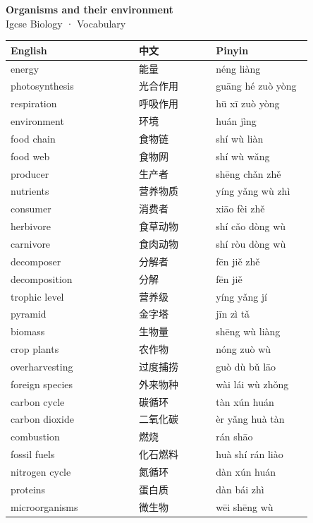 \documentclass[11pt]{article}
\begin{document}
\begin{center}
  {\LARGE\bfseries Organisms and their environment}\\[0.35em]
  {\large Igcse Biology · Vocabulary}
\end{center}
\vspace{0.6em}

\begin{longtable}{@{}p{0.40\linewidth}p{0.24\linewidth}p{0.30\linewidth}@{}}
\toprule
\textbf{English} & \textbf{中文} & \textbf{Pinyin} \\
\midrule
\endhead
\bottomrule
\endlastfoot
energy & 能量 & néng liàng \\
photosynthesis & 光合作用 & guāng hé zuò yòng \\
respiration & 呼吸作用 & hū xī zuò yòng \\
environment & 环境 & huán jìng \\
food chain & 食物链 & shí wù liàn \\
food web & 食物网 & shí wù wǎng \\
producer & 生产者 & shēng chǎn zhě \\
nutrients & 营养物质 & yíng yǎng wù zhì \\
consumer & 消费者 & xiāo fèi zhě \\
herbivore & 食草动物 & shí cǎo dòng wù \\
carnivore & 食肉动物 & shí ròu dòng wù \\
decomposer & 分解者 & fēn jiě zhě \\
decomposition & 分解 & fēn jiě \\
trophic level & 营养级 & yíng yǎng jí \\
pyramid & 金字塔 & jīn zì tǎ \\
biomass & 生物量 & shēng wù liàng \\
crop plants & 农作物 & nóng zuò wù \\
overharvesting & 过度捕捞 & guò dù bǔ lāo \\
foreign species & 外来物种 & wài lái wù zhǒng \\
carbon cycle & 碳循环 & tàn xún huán \\
carbon dioxide & 二氧化碳 & èr yǎng huà tàn \\
combustion & 燃烧 & rán shāo \\
fossil fuels & 化石燃料 & huà shí rán liào \\
nitrogen cycle & 氮循环 & dàn xún huán \\
proteins & 蛋白质 & dàn bái zhì \\
microorganisms & 微生物 & wēi shēng wù \\

\end{longtable}
\end{document}
